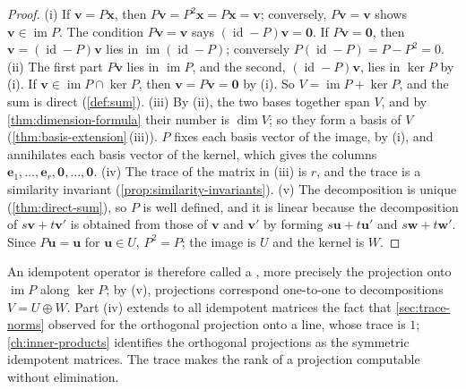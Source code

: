 \begin{proof}
(i) If $\mathbf v=P\mathbf x$, then $P\mathbf v=P^2\mathbf x=P\mathbf x=\mathbf v$; conversely, $P\mathbf v=\mathbf v$ shows $\mathbf v\in\operatorname{im}P$. The condition $P\mathbf v=\mathbf v$ says $(\operatorname{id}-P)\mathbf v=\mathbf 0$. If $P\mathbf v=\mathbf 0$, then $\mathbf v=(\operatorname{id}-P)\mathbf v$ lies in $\operatorname{im}(\operatorname{id}-P)$; conversely $P(\operatorname{id}-P)=P-P^2=0$. (ii) The first part $P\mathbf v$ lies in $\operatorname{im}P$, and the second, $(\operatorname{id}-P)\mathbf v$, lies in $\ker P$ by (i). If $\mathbf v\in\operatorname{im}P\cap\ker P$, then $\mathbf v=P\mathbf v=\mathbf 0$ by (i). So $V=\operatorname{im}P+\ker P$, and the sum is direct (\cref{def:sum}). (iii) By (ii), the two bases together span $V$, and by \cref{thm:dimension-formula} their number is $\dim V$; so they form a basis of $V$ (\cref{thm:basis-extension}\,(iii)). $P$ fixes each basis vector of the image, by (i), and annihilates each basis vector of the kernel, which gives the columns $\mathbf e_1,\ldots,\mathbf e_r,\mathbf 0,\ldots,\mathbf 0$. (iv) The trace of the matrix in (iii) is $r$, and the trace is a similarity invariant (\cref{prop:similarity-invariants}). (v) The decomposition is unique (\cref{thm:direct-sum}), so $P$ is well defined, and it is linear because the decomposition of $s\mathbf v+t\mathbf v'$ is obtained from those of $\mathbf v$ and $\mathbf v'$ by forming $s\mathbf u+t\mathbf u'$ and $s\mathbf w+t\mathbf w'$. Since $P\mathbf u=\mathbf u$ for $\mathbf u\in U$, $P^2=P$; the image is $U$ and the kernel is $W$.
\end{proof}

An idempotent operator is therefore called a , more precisely the projection onto $\operatorname{im}P$ along $\ker P$; by (v), projections correspond one-to-one to decompositions $V=U\oplus W$. Part (iv) extends to all idempotent matrices the fact that \cref{sec:trace-norms} observed for the orthogonal projection onto a line, whose trace is $1$; \cref{ch:inner-products} identifies the orthogonal projections as the symmetric idempotent matrices. The trace makes the rank of a projection computable without elimination.

